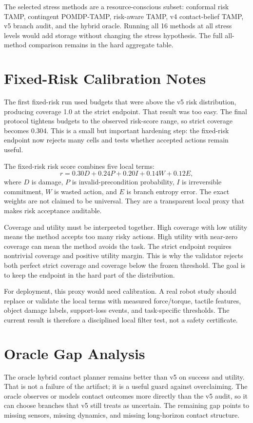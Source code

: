 \documentclass{article}
\begin{document}
The selected stress methods are a resource-conscious subset: conformal risk TAMP, contingent POMDP-TAMP, risk-aware TAMP, v4 contact-belief TAMP, v5 branch audit, and the hybrid oracle. Running all 16 methods at all stress levels would add storage without changing the stress hypothesis. The full all-method comparison remains in the hard aggregate table.

\clearpage
\section{Fixed-Risk Calibration Notes}
The first fixed-risk run used budgets that were above the v5 risk distribution, producing coverage 1.0 at the strict endpoint. That result was too easy. The final protocol tightens budgets to the observed risk-score range, so strict coverage becomes 0.304. This is a small but important hardening step: the fixed-risk endpoint now rejects many cells and tests whether accepted actions remain useful.

The fixed-risk risk score combines five local terms:
\[
  r = 0.30D + 0.24P + 0.20I + 0.14W + 0.12E,
\]
where $D$ is damage, $P$ is invalid-precondition probability, $I$ is irreversible commitment, $W$ is wasted action, and $E$ is branch entropy error. The exact weights are not claimed to be universal. They are a transparent local proxy that makes risk acceptance auditable.

Coverage and utility must be interpreted together. High coverage with low utility means the method accepts too many risky actions. High utility with near-zero coverage can mean the method avoids the task. The strict endpoint requires nontrivial coverage and positive utility margin. This is why the validator rejects both perfect strict coverage and coverage below the frozen threshold. The goal is to keep the endpoint in the hard part of the distribution.

For deployment, this proxy would need calibration. A real robot study should replace or validate the local terms with measured force/torque, tactile features, object damage labels, support-loss events, and task-specific thresholds. The current result is therefore a disciplined local filter test, not a safety certificate.

\clearpage
\section{Oracle Gap Analysis}
The oracle hybrid contact planner remains better than v5 on success and utility. That is not a failure of the artifact; it is a useful guard against overclaiming. The oracle observes or models contact outcomes more directly than the v5 audit, so it can choose branches that v5 still treats as uncertain. The remaining gap points to missing sensors, missing dynamics, and missing long-horizon contact structure.
\end{document}

